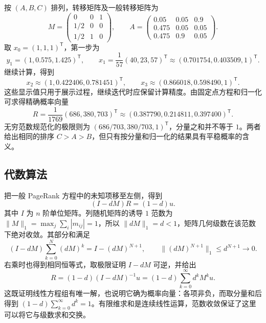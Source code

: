 \begin{solve}
按 $(A,B,C)$ 排列，转移矩阵及一般转移矩阵为
\[
    M=\begin{pmatrix}0&0&1\\1/2&0&0\\1/2&1&0\end{pmatrix},\qquad
    A=\begin{pmatrix}
        0.05&0.05&0.9\\
        0.475&0.05&0.05\\
        0.475&0.9&0.05
    \end{pmatrix}.
\]
取 $x_0=(1,1,1)^{\mathsf T}$，第一步为
\[
    y_1=(1,0.575,1.425)^{\mathsf T},\qquad
    x_1=\frac1{57}(40,23,57)^{\mathsf T}
        \approx(0.701754,0.403509,1)^{\mathsf T}.
\]
继续计算，得到
\[
    x_2\approx(1,0.422406,0.781451)^{\mathsf T},\qquad
    x_3\approx(0.866018,0.598490,1)^{\mathsf T}.
\]
这些显示值只用于展示过程，继续迭代时应保留计算精度。由固定点方程和归一化可求得精确概率向量
\begin{equation}
\label{eq:lihang-pr-three-result}
    R=\frac1{1769}(686,380,703)^{\mathsf T}
      \approx(0.387790,0.214811,0.397400)^{\mathsf T}.
\end{equation}
无穷范数规范化的极限则为 $(686/703,380/703,1)^{\mathsf T}$，分量之和并不等于 $1$。两者给出相同的排序 $C>A>B$，但只有按分量和归一化的结果具有平稳概率的含义。
\end{solve}

\subsection{代数算法}
\label{subsec:lihang-pr-algebra}

把一般 PageRank 方程中的未知项移至左侧，得到
\begin{equation}
\label{eq:lihang-pr-linear-system}
    (I-dM)R=(1-d)u.
\end{equation}
其中 $I$ 为 $n$ 阶单位矩阵。列随机矩阵的诱导 $1$ 范数为 $\|M\|_1=\max_j\sum_i|m_{ij}|=1$，所以 $\|dM\|_1=d<1$，矩阵几何级数在该范数下绝对收敛。其部分和满足
\[
    (I-dM)\sum_{k=0}^{N}(dM)^k=I-(dM)^{N+1},\qquad
    \|(dM)^{N+1}\|_1\leq d^{N+1}\longrightarrow0.
\]
右乘时也得到相同恒等式，取极限证明 $I-dM$ 可逆，并给出
\begin{equation}
\label{eq:lihang-pr-neumann-series}
    R=(1-d)(I-dM)^{-1}u
      =(1-d)\sum_{k=0}^{\infty}d^kM^ku.
\end{equation}
这既证明线性方程组有唯一解，也说明它确为概率向量：各项非负，而取分量和后得到 $(1-d)\sum_{k=0}^{\infty}d^k=1$。有限维求和是连续线性运算，范数收敛保证了这里可以将它与级数求和交换。

